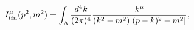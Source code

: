 \begin{equation}
I_{lin}^{\mu }(p^{2},m^{2})=\int_{\Lambda }\frac{d^{4}k}{(2\pi )^{4}}\frac{%
k^{\mu }}{(k^{2}-m^{2})[(p-k)^{2}-m^{2}]},
\end{equation}

